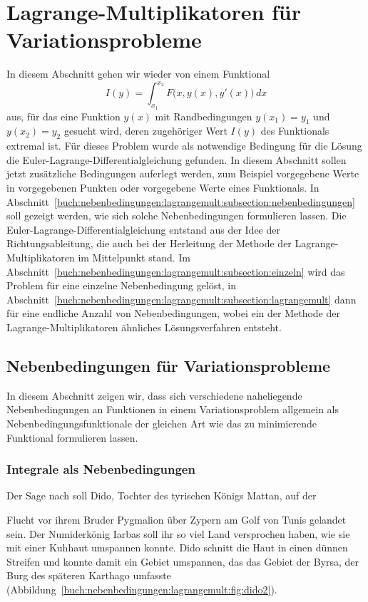 %
%
%
\section{Lagrange-Multiplikatoren für Variationsprobleme
\label{buch:nebenbedingungen:section:lagrangemult}}
In diesem Abschnitt gehen wir wieder von einem Funktional
\begin{equation}
I(y)
=
\int_{x_1}^{x_2}
F\bigl(x,y(x),y'(x)\bigr)
\,dx
\label{buch:nebenbedingungen:lagrangemult:eqn:}
\end{equation}
aus, für das eine Funktion $y(x)$ mit Randbedingungen $y(x_1)=y_1$ und
$y(x_2)=y_2$ gesucht wird, deren zugehöriger Wert $I(y)$ des
Funktionals extremal ist.
Für dieses Problem wurde als notwendige Bedingung für die Lösung die
Euler-Lagrange-Differentialgleichung gefunden.
In diesem Abschnitt sollen jetzt zusätzliche Bedingungen auferlegt 
werden, zum Beispiel vorgegebene Werte in vorgegebenen Punkten oder
vorgegebene Werte eines Funktionals.
In
Abschnitt~\ref{buch:nebenbedingungen:lagrangemult:subsection:nebenbedingungen}
soll gezeigt werden, wie sich solche Nebenbedingungen formulieren
lassen.
Die Euler-Lagrange-Differentialgleichung entstand aus der Idee
der Richtungsableitung, die auch bei der Herleitung der Methode
der Lagrange-Multiplikatoren im Mittelpunkt stand.
Im
Abschnitt~\ref{buch:nebenbedingungen:lagrangemult:subsection:einzeln}
wird das Problem für eine einzelne Nebenbedingung gelöst, in
Abschnitt~\ref{buch:nebenbedingungen:lagrangemult:subsection:lagrangemult}
dann für eine endliche Anzahl von Nebenbedingungen, wobei ein der
Methode der Lagrange-Multiplikatoren ähnliches Lösungsverfahren entsteht.

%
%
\subsection{Nebenbedingungen für Variationsprobleme
\label{buch:nebenbedingungen:lagrangemult:subsection:nebenbedingungen}}
In diesem Abschnitt zeigen wir, dass sich verschiedene naheliegende
Nebenbedingungen an Funktionen in einem Variationsproblem allgemein
als Nebenbedingungsfunktionale der gleichen Art wie das zu minimierende
Funktional formulieren lassen.

%
%
\subsubsection{Integrale als Nebenbedingungen}
Der Sage nach soll Dido, Tochter des tyrischen Königs Mattan, auf der

Flucht vor ihrem Bruder Pygmalion über Zypern am Golf von Tunis 
gelandet sein.
%
%
%
%
Der Numiderkönig Iarbas soll ihr so viel Land versprochen haben, wie
sie mit einer Kuhhaut umspannen konnte.
%
Dido schnitt die Haut in einen dünnen Streifen und konnte damit ein
Gebiet umspannen, das das Gebiet der Byrsa, der Burg des späteren
Karthago umfasste
(Abbildung~\ref{buch:nebenbedingungen:lagrangemult:fig:dido2}).
%
%

